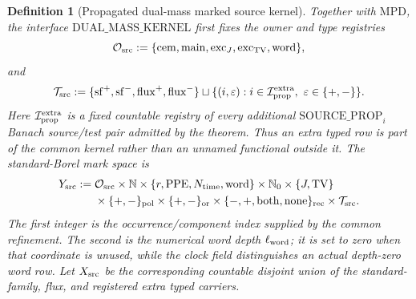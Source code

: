 \documentclass[11pt]{article}
\newtheorem{definition}[theorem]{Definition}
\begin{document}
\begin{definition}[Propagated dual-mass marked source kernel]
\label{def:source-incidence-space}
Together with $\mathrm{MPD}$, the interface
$\mathrm{DUAL\_MASS\_KERNEL}$ first fixes the owner and type registries
\[
 \mathcal O_{\rm src}:=
 \{{\rm cem},{\rm main},{\rm exc}_J,{\rm exc}_{\rm TV},
   {\rm word}\},
\]
and
\[
 \mathcal T_{\rm src}:=
 \{{\rm sf}^{+},{\rm sf}^{-},{\rm flux}^{+},{\rm flux}^{-}\}
 \sqcup\{(i,\varepsilon):i\in\mathcal I_{\rm prop}^{\rm extra},
                    \ \varepsilon\in\{+,-\}\}.
\]
Here $\mathcal I_{\rm prop}^{\rm extra}$ is a fixed countable registry of
every additional $\mathrm{SOURCE\_PROP}_i$ Banach source/test pair admitted
by the theorem.  Thus an extra typed row is part of the common kernel rather
than an unnamed functional outside it.  The standard-Borel mark space is
\[
 \begin{aligned}
 Y_{\rm src}:={}&\mathcal O_{\rm src}\times\mathbb N\times
 \{r,\mathrm{PPE},N_{\rm time},\mathrm{word}\}\times
 \mathbb N_0\times\{J,\mathrm{TV}\}\\
 &\times\{+,-\}_{\rm pol}\times\{+,-\}_{\rm or}\times
 \{-,+,\mathrm{both},\mathrm{none}\}_{\rm rec}\times
 \mathcal T_{\rm src}.
 \end{aligned}
\]
The first integer is the occurrence/component index supplied by the common
refinement.  The second is the numerical word depth $\ell_{\rm word}$; it is
set to zero when that coordinate is unused, while the clock field
distinguishes an actual depth-zero word row.  Let $X_{\rm src}$ be the corresponding countable disjoint union
of the standard-family, flux, and registered extra typed carriers.


\end{definition}
\end{document}
